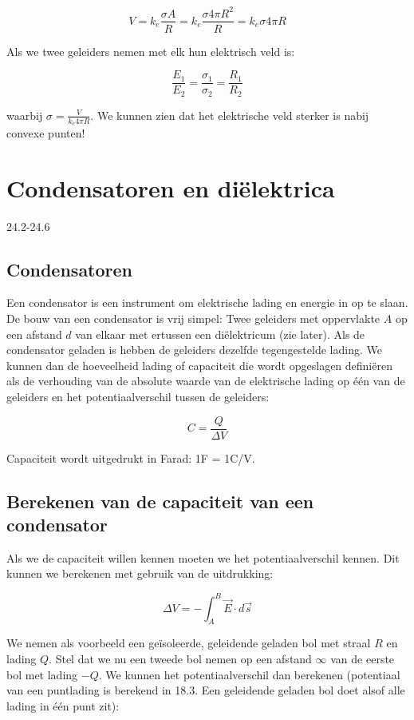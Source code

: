 \documentclass[12pt,a4paper]{article}
\begin{document}
    $$V = k_{e}\frac{\sigma A}{R} = k_{e} \frac{\sigma 4\pi R^{2}}{R} = k_{e}\sigma 4 \pi R$$
    
    Als we twee geleiders nemen met elk hun elektrisch veld is:
    
    $$\frac{E_{1}}{E_{2}} = \frac{\sigma_{1}}{\sigma_{2}} = \frac{R_{1}}{R_{2}}$$ 
    
    waarbij $\sigma = \frac{V}{k_{e}4\pi R}$. We kunnen zien dat het elektrische veld sterker is
    nabij convexe punten!

    \section{Condensatoren en diëlektrica}
    24.2-24.6
    
    \subsection{Condensatoren}
    Een condensator is een instrument om elektrische lading en energie in op te slaan. De bouw van een
    condensator is vrij simpel: Twee geleiders met oppervlakte $A$ op een afstand $d$ van elkaar met
    ertussen een diëlektricum (zie later). Als de condensator geladen is hebben de geleiders dezelfde 
    tegengestelde lading. We kunnen dan de hoeveelheid lading of capaciteit die wordt opgeslagen definiëren als
    de verhouding van de absolute waarde van de elektrische lading op één van de geleiders en het
    potentiaalverschil tussen de geleiders:
    
    $$C = \frac{Q}{\Delta V}$$

    Capaciteit wordt uitgedrukt in Farad: 1F = 1C/V.
    
    \subsection{Berekenen van de capaciteit van een condensator}
    Als we de capaciteit willen kennen moeten we het potentiaalverschil kennen. Dit kunnen
    we berekenen met gebruik van de uitdrukking:
    
    $$\Delta V = -\int_{A}^{B} \vec{E} \cdot d\vec{s}$$
    
    We nemen als voorbeeld een geïsoleerde, geleidende geladen bol met straal $R$ en lading $Q$. Stel dat
    we nu een tweede bol nemen op een afstand $\infty$ van de eerste bol met lading $-Q$. We kunnen het potentiaalverschil
    dan berekenen (potentiaal van een puntlading is berekend in 18.3. Een geleidende geladen bol doet alsof alle lading in één punt zit):
    
\end{document}
